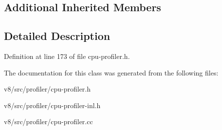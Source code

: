\subsection*{Additional Inherited Members}


\subsection{Detailed Description}


Definition at line 173 of file cpu-\/profiler.\+h.



The documentation for this class was generated from the following files\+:\begin{DoxyCompactItemize}
\item 
v8/src/profiler/cpu-\/profiler.\+h\item 
v8/src/profiler/cpu-\/profiler-\/inl.\+h\item 
v8/src/profiler/cpu-\/profiler.\+cc\end{DoxyCompactItemize}
